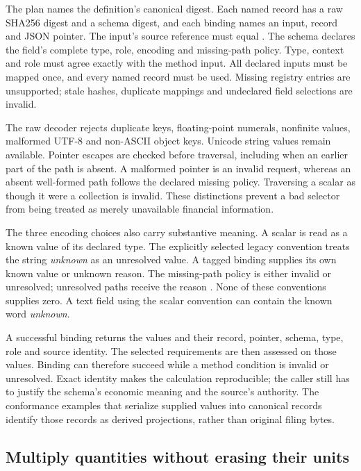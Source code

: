 The plan names the definition's canonical digest. Each named record has a raw
SHA256 digest and a schema digest, and each binding names an input, record and
JSON pointer. The input's source reference must equal
. The schema declares the field's complete type,
role, encoding and missing-path policy. Type, context and role must agree exactly
with the method input. All declared inputs must be mapped once, and every named
record must be used. Missing registry entries are unsupported; stale hashes,
duplicate mappings and undeclared field selections are invalid.

The raw decoder rejects duplicate keys, floating-point numerals, nonfinite
values, malformed UTF-8 and non-ASCII object keys. Unicode string values remain
available. Pointer escapes are checked before traversal, including when an
earlier part of the path is absent. A malformed pointer is an invalid request,
whereas an absent well-formed path follows the declared missing policy. Traversing
a scalar as though it were a collection is invalid. These distinctions prevent a
bad selector from being treated as merely unavailable financial information.

The three encoding choices also carry substantive meaning. A scalar is read as
a known value of its declared type. The explicitly selected legacy convention
treats the string \emph{unknown} as an unresolved value. A tagged binding supplies
its own known value or unknown reason. The missing-path policy is either invalid
or unresolved; unresolved paths receive the reason
. None of these conventions supplies zero. A text
field using the scalar convention can contain the known word \emph{unknown}.

A successful binding returns the values and their record, pointer, schema,
type, role and source identity. The selected requirements are then assessed on
those values. Binding can therefore succeed while a method condition is invalid
or unresolved. Exact identity makes the calculation reproducible; the caller
still has to justify the schema's economic meaning and the source's authority.
The conformance examples that serialize supplied values into canonical records
identify those records as derived projections, rather than original filing bytes.

\subsection{Multiply quantities without erasing their units}

